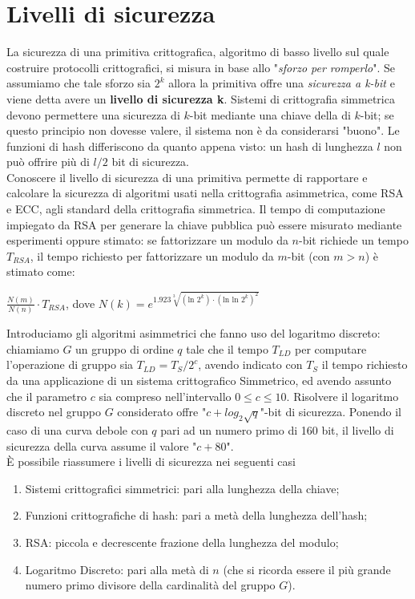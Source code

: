 \documentclass[a4paper,12pt]{tesiinfo}
\newcommand\ddfrac[2]{\frac{\displaystyle #1}{\displaystyle #2}}
\begin{document}
\chapter{Livelli di sicurezza}
La sicurezza di una primitiva crittografica, algoritmo di basso livello sul quale costruire protocolli crittografici, si misura in base allo "\textit{sforzo per romperlo}". Se assumiamo che tale sforzo sia $2^k$ allora la primitiva offre una \textit{sicurezza a k-bit} e viene detta avere un \textbf{livello di sicurezza k}. Sistemi di crittografia simmetrica devono permettere una sicurezza di $k$-bit mediante una chiave della di $k$-bit; se questo principio non dovesse valere, il sistema non \`e da considerarsi "buono". Le funzioni di hash differiscono da quanto appena visto: un hash di lunghezza $l$ non pu\`o offrire pi\`u di $l \big / 2$ bit di sicurezza. 
\\
Conoscere il livello di sicurezza di una primitiva permette di rapportare e calcolare la sicurezza di algoritmi usati nella crittografia asimmetrica, come RSA e ECC, agli standard della crittografia simmetrica. Il tempo di computazione impiegato da RSA per generare la chiave pubblica pu\`o essere misurato mediante esperimenti oppure stimato: se fattorizzare un modulo da $n$-bit richiede un tempo $T_{RSA}$, il tempo richiesto per fattorizzare un modulo da $m$-bit (con $m>n$) \`e stimato come: 
\begin{center}
    $ \ddfrac{N(m)}{N(n)} \cdot T_{RSA}$, dove $N(k) = e^{1.923 \sqrt[3]{( \text{ln }2^k) \cdot ( \text{ln ln }2^k)^{2}}}$
\end{center}
Introduciamo gli algoritmi asimmetrici che fanno uso del logaritmo discreto: chiamiamo $G$ un gruppo di ordine $q$ tale che il tempo $T_{LD}$ per computare l'operazione di gruppo sia $T_{LD} = T_S \big / 2^c$, avendo indicato con $T_S$ il tempo richiesto da una applicazione di un sistema crittografico Simmetrico, ed avendo assunto che il parametro $c$ sia compreso nell'intervallo $0 \leq c \leq 10$. Risolvere il logaritmo discreto nel gruppo $G$ considerato offre "$c+log_2\sqrt{q}$"-bit di sicurezza. Ponendo il caso di una curva debole con $q$ pari ad un numero primo di 160 bit, il livello di sicurezza della curva assume il valore "$c+80$".
\\
\`E possibile riassumere i livelli di sicurezza nei seguenti casi
\begin{enumerate}
    \item Sistemi crittografici simmetrici: pari alla lunghezza della chiave;
    \item Funzioni crittografiche di hash: pari a met\`a della lunghezza dell'hash;
    \item RSA: piccola e decrescente frazione della lunghezza del modulo;
    \item Logaritmo Discreto: pari alla met\`a di $n$ (che si ricorda essere il pi\`u grande numero primo divisore della cardinalit\`a del gruppo $G$).
\end{enumerate}
\end{document}

